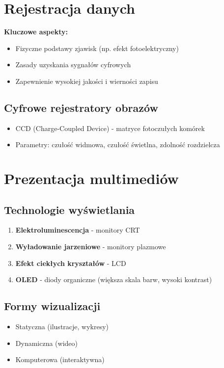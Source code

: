 \section{Rejestracja danych}
\textbf{Kluczowe aspekty:}
\begin{itemize}[noitemsep]
    \item Fizyczne podstawy zjawisk (np. efekt fotoelektryczny)
    \item Zasady uzyskania sygnałów cyfrowych
    \item Zapewnienie wysokiej jakości i wierności zapisu
\end{itemize}

\subsection{Cyfrowe rejestratory obrazów}
\begin{itemize}[noitemsep]
    \item CCD (Charge-Coupled Device) - matryce fotoczułych komórek
    \item Parametry: czułość widmowa, czułość świetlna, zdolność rozdzielcza
\end{itemize}

\section{Prezentacja multimediów}
\subsection{Technologie wyświetlania}
\begin{enumerate}[noitemsep]
    \item \textbf{Elektroluminescencja} - monitory CRT
    \item \textbf{Wyładowanie jarzeniowe} - monitory plazmowe
    \item \textbf{Efekt ciekłych kryształów} - LCD
    \item \textbf{OLED} - diody organiczne (większa skala barw, wysoki kontrast)
\end{enumerate}

\subsection{Formy wizualizacji}
\begin{itemize}[noitemsep]
    \item Statyczna (ilustracje, wykresy)
    \item Dynamiczna (wideo)
    \item Komputerowa (interaktywna)
\end{itemize}

